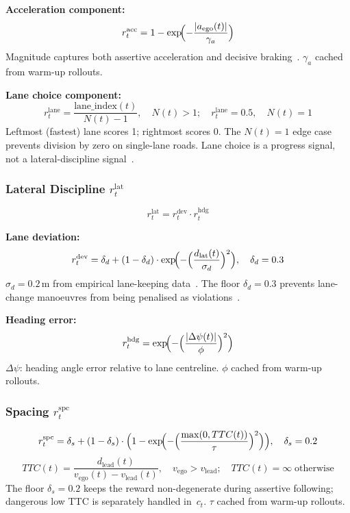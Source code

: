 \documentclass[conference]{IEEEtran}
\begin{document}
\textbf{Acceleration component:}
\begin{equation}
r^{\text{acc}}_{t}=1-\exp\!\Bigl(-\frac{|a_{\text{ego}}(t)|}{\gamma_{a}}\Bigr)
\end{equation}
Magnitude captures both assertive acceleration and decisive
braking~\cite{Surmann2025}. $\gamma_{a}$ cached from warm-up rollouts.

\textbf{Lane choice component:}
\begin{equation}
r^{\text{lane}}_{t}=\frac{\text{lane\_index}(t)}{N(t)-1},\quad
N(t)>1;\quad r^{\text{lane}}_{t}=0.5,\quad N(t)=1
\end{equation}
Leftmost (fastest) lane scores 1; rightmost scores 0. The $N(t)=1$
edge case prevents division by zero on single-lane roads.
Lane choice is a progress signal, not a lateral-discipline
signal~\cite{RewardReview2024}.

\subsubsection{Lateral Discipline $r^{\text{lat}}_{t}$}

\begin{equation}
r^{\text{lat}}_{t}=r^{\text{dev}}_{t}\cdot r^{\text{hdg}}_{t}
\label{eq:lateral}
\end{equation}

\textbf{Lane deviation:}
\begin{equation}
r^{\text{dev}}_{t}=
  \delta_{d}+(1-\delta_{d})\cdot
  \exp\!\Bigl(-\Bigl(\frac{d_{\text{lat}}(t)}{\sigma_{d}}\Bigr)^{2}\Bigr),
\quad \delta_{d}=0.3
\end{equation}
$\sigma_{d}=0.2$\,m from empirical lane-keeping
data~\cite{LKAEmpirical2025}. The floor $\delta_{d}=0.3$ prevents
lane-change manoeuvres from being penalised as
violations~\cite{Haselberger2024}.

\textbf{Heading error:}
\begin{equation}
r^{\text{hdg}}_{t}=
  \exp\!\Bigl(-\Bigl(\frac{|\Delta\psi(t)|}{\phi}\Bigr)^{2}\Bigr)
\end{equation}
$\Delta\psi$: heading angle error relative to lane centreline.
$\phi$ cached from warm-up rollouts.

\subsubsection{Spacing $r^{\text{spc}}_{t}$}

\begin{equation}
r^{\text{spc}}_{t}=
  \delta_{s}+(1-\delta_{s})\cdot
  \Bigl(1-\exp\!\Bigl(-\Bigl(\frac{\max(0,TTC(t))}{\tau}\Bigr)^{2}\Bigr)\Bigr),
\quad\delta_{s}=0.2
\label{eq:spacing}
\end{equation}
\begin{equation}
TTC(t)=\frac{d_{\text{lead}}(t)}{v_{\text{ego}}(t)-v_{\text{lead}}(t)},
\quad v_{\text{ego}}>v_{\text{lead}};\quad
TTC(t)=\infty\;\text{otherwise}
\end{equation}
The floor $\delta_{s}=0.2$ keeps the reward non-degenerate during
assertive following; dangerous low TTC is separately handled in~$c_{t}$.
$\tau$ cached from warm-up rollouts.
\end{document}
